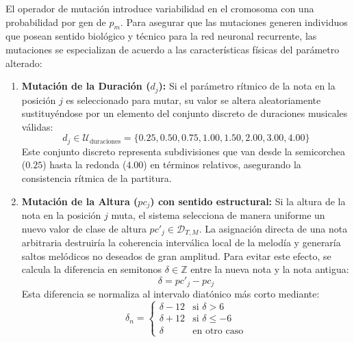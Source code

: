 \documentclass[12pt]{report}
\begin{document}
El operador de mutación introduce variabilidad en el cromosoma con una probabilidad por gen de $p_m$. Para asegurar que las mutaciones generen individuos que posean sentido biológico y técnico para la red neuronal recurrente, las mutaciones se especializan de acuerdo a las características físicas del parámetro alterado:
\begin{enumerate}
    \item \textbf{Mutación de la Duración ($d_j$):} Si el parámetro rítmico de la nota en la posición $j$ es seleccionado para mutar, su valor se altera aleatoriamente sustituyéndose por un elemento del conjunto discreto de duraciones musicales válidas:
    \begin{equation}
        d_j \in \mathcal{U}_{\text{duraciones}} = \{0.25, 0.50, 0.75, 1.00, 1.50, 2.00, 3.00, 4.00\}
    \end{equation}
    Este conjunto discreto representa subdivisiones que van desde la semicorchea ($0.25$) hasta la redonda ($4.00$) en términos relativos, asegurando la consistencia rítmica de la partitura.
    
    \item \textbf{Mutación de la Altura ($pc_j$) con sentido estructural:} Si la altura de la nota en la posición $j$ muta, el sistema selecciona de manera uniforme un nuevo valor de clase de altura $pc'_j \in \mathcal{D}_{T,M}$. La asignación directa de una nota arbitraria destruiría la coherencia interválica local de la melodía y generaría saltos melódicos no deseados de gran amplitud. Para evitar este efecto, se calcula la diferencia en semitonos $\delta \in \mathbb{Z}$ entre la nueva nota y la nota antigua:
    \begin{equation}
        \delta = pc'_j - pc_j
    \end{equation}
    Esta diferencia se normaliza al intervalo diatónico más corto mediante:
    \begin{equation}
        \delta_n = \begin{cases} \delta - 12 & \text{si } \delta > 6 \\ \delta + 12 & \text{si } \delta \le -6 \\ \delta & \text{en otro caso} \end{cases}
    \end{equation}
    

\end{enumerate}
\end{document}
